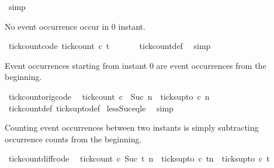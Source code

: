 \begin{isabellebody}
\ simp\isanewline
{}\isamarkupfalse%
%
\endisatagproof
{\isafoldproof}%
%
\isadelimproof
%
\endisadelimproof
%
\begin{isamarkuptext}%
No event occurrence occur in 0 instant.%
\end{isamarkuptext}\isamarkuptrue%
\isamarkupfalse%
\ tick{\isacharunderscore}count{\isacharunderscore}{}{\isacharbrackleft}code{\isacharbrackright}{\isacharcolon}\ {\isacartoucheopen}tick{\isacharunderscore}count\ c\ t\ {}\ {\isacharequal}\ {}{\isacartoucheclose}\isanewline
%
\isadelimproof
\ \ %
\endisadelimproof
%
\isatagproof
{}\isamarkupfalse%
\ tick{\isacharunderscore}count{\isacharunderscore}def\ \isamarkupfalse%
\ simp%
\endisatagproof
{\isafoldproof}%
%
\isadelimproof
%
\endisadelimproof
%
\begin{isamarkuptext}%
Event occurrences starting from instant 0 are event occurrences from the beginning.%
\end{isamarkuptext}\isamarkuptrue%
\isamarkupfalse%
\ tick{\isacharunderscore}count{\isacharunderscore}orig{\isacharbrackleft}code{\isacharbrackright}{\isacharcolon}\isanewline
\ \ {\isacartoucheopen}tick{\isacharunderscore}count\ c\ {}\ {\isacharparenleft}Suc\ n{\isacharparenright}\ {\isacharequal}\ ticks{\isacharunderscore}up{\isacharunderscore}to\ c\ n{\isacartoucheclose}\isanewline
%
\isadelimproof
%
\endisadelimproof
%
\isatagproof
{}\isamarkupfalse%
\ tick{\isacharunderscore}count{\isacharunderscore}def\ ticks{\isacharunderscore}up{\isacharunderscore}to{\isacharunderscore}def\isanewline
{}\isamarkupfalse%
\ less{\isacharunderscore}Suc{\isacharunderscore}eq{\isacharunderscore}le\ \isamarkupfalse%
\ simp%
\endisatagproof
{\isafoldproof}%
%
\isadelimproof
%
\endisadelimproof
%
\begin{isamarkuptext}%
Counting event occurrences between two instants is simply subtracting
occurrence counts from the beginning.%
\end{isamarkuptext}\isamarkuptrue%
\isamarkupfalse%
\ tick{\isacharunderscore}count{\isacharunderscore}diff{\isacharbrackleft}code{\isacharbrackright}{\isacharcolon}\isanewline
\ \ {\isacartoucheopen}tick{\isacharunderscore}count\ c\ {\isacharparenleft}Suc\ t\ n\ {\isacharequal}\ {\isacharparenleft}ticks{\isacharunderscore}up{\isacharunderscore}to\ c\ {\isacharparenleft}tn{\isacharparenright}{\isacharparenright}\ {\isacharminus}\ {\isacharparenleft}ticks{\isacharunderscore}up{\isacharunderscore}to\ c\ t\isanewline

\end{isabellebody}
